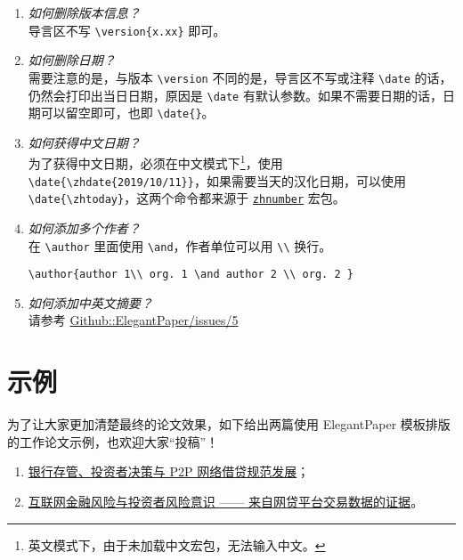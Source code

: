 \documentclass[lang=cn,11pt,authoryear,a4paper]{elegantpaper}
\begin{document}
\begin{enumerate}[label=\arabic*).]
  \item \textit{如何删除版本信息？}\\
      导言区不写 \lstinline|\version{x.xx}| 即可。
  \item \textit{如何删除日期？}\\
      需要注意的是，与版本 \lstinline{\version} 不同的是，导言区不写或注释 \lstinline{\date} 的话，仍然会打印出当日日期，原因是 \lstinline{\date} 有默认参数。如果不需要日期的话，日期可以留空即可，也即 \lstinline|\date{}|。
  \item \textit{如何获得中文日期？}\\
      为了获得中文日期，必须在中文模式下\footnote{英文模式下，由于未加载中文宏包，无法输入中文。}，使用 \lstinline|\date{\zhdate{2019/10/11}}|，如果需要当天的汉化日期，可以使用 \lstinline|\date{\zhtoday}|，这两个命令都来源于 \href{https://ctan.org/pkg/zhnumber}{\lstinline{zhnumber}} 宏包。
  \item \textit{如何添加多个作者？}\\
      在 \lstinline{\author} 里面使用 \lstinline{\and}，作者单位可以用 \lstinline{\\} 换行。\begin{lstlisting}
\author{author 1\\ org. 1 \and author 2 \\ org. 2 }
\end{lstlisting}
  \item \textit{如何添加中英文摘要？}\\
      请参考 \href{https://github.com/ElegantLaTeX/ElegantPaper/issues/5}{Github::ElegantPaper/issues/5}
\end{enumerate}

\section{示例}

为了让大家更加清楚最终的论文效果，如下给出两篇使用 ElegantPaper 模板排版的工作论文示例，也欢迎大家“投稿”！

\begin{enumerate}
  \item \href{https://github.com/EthanDeng/bank-custody}{银行存管、投资者决策与 P2P 网络借贷规范发展}；
  \item \href{https://github.com/EthanDeng/risk-awareness}{互联网金融风险与投资者风险意识 —— 来自网贷平台交易数据的证据}。
\end{enumerate}
\end{document}
